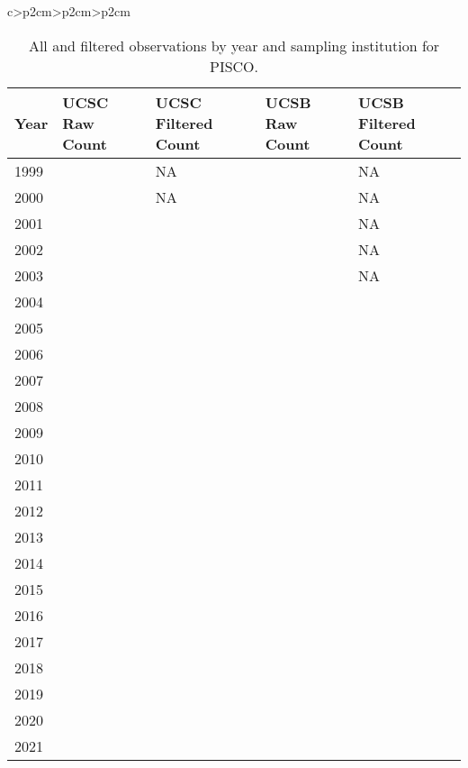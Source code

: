 \documentclass[11pt,
  letterpaper,
]{article}
\begin{document}
\begin{longtable}[t]{c>{\centering\arraybackslash}p{2cm}>{\centering\arraybackslash}p{2cm}>{\centering\arraybackslash}p{2cm}}
\begin{table}[H]
\centering\centering\centering
\caption{\label{tab:pisco-data}All and filtered observations by year and sampling institution for PISCO.}
\centering
\fontsize{10}{12}\selectfont
\fontsize{10}{12}\selectfont
\begin{tabular}[t]{l>{\raggedright\arraybackslash}p{1.6cm}>{\raggedright\arraybackslash}p{1.6cm}>{\raggedright\arraybackslash}p{1.6cm}>{\raggedright\arraybackslash}p{1.6cm}}
\toprule
Year & UCSC Raw Count & UCSC Filtered Count & UCSB Raw Count & UCSB Filtered Count\\
\midrule
1999 & 2 & NA & 7 & NA\\
2000 & 1 & NA & 11 & NA\\
2001 & 6 & 4 & 4 & NA\\
2002 & 25 & 21 & 8 & NA\\
2003 & 34 & 25 & 73 & NA\\
2004 & 30 & 9 & 65 & 19\\
2005 & 40 & 6 & 45 & 18\\
2006 & 27 & 12 & 51 & 25\\
2007 & 17 & 4 & 58 & 19\\
2008 & 21 & 5 & 44 & 22\\
2009 & 20 & 7 & 60 & 29\\
2010 & 34 & 10 & 85 & 32\\
2011 & 36 & 1 & 44 & 20\\
2012 & 9 & 4 & 77 & 39\\
2013 & 40 & 17 & 59 & 23\\
2014 & 50 & 28 & 50 & 39\\
2015 & 51 & 16 & 18 & 15\\
2016 & 29 & 17 & 51 & 45\\
2017 & 30 & 11 & 28 & 22\\
2018 & 37 & 15 & 42 & 28\\
2019 & 26 & 15 & 41 & 37\\
2020 & 58 & 26 & 35 & 29\\
2021 & 23 & 12 & 37 & 27\\
\bottomrule
\end{tabular}
\end{table}

\newpage



\newpage



\newpage


\end{longtable}
\end{document}
